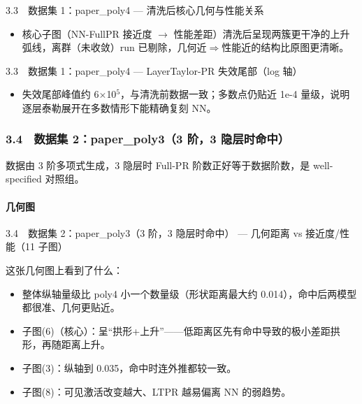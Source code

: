 \documentclass[UTF8,a4paper,11pt]{ctexart}
\begin{document}
3.3　数据集 1：paper\_poly4 --- 清洗后核心几何与性能关系

\begin{itemize}
\item 核心子图（NN-FullPR 接近度 $\to$ 性能差距）清洗后呈现两簇更干净的上升弧线，离群（未收敛）run 已剔除，几何近$\Rightarrow$性能近的结构比原图更清晰。
\end{itemize}

3.3　数据集 1：paper\_poly4 --- LayerTaylor-PR 失效尾部（log 轴）

\begin{itemize}
\item 失效尾部峰值约 6$\times$10$^5$，与清洗前数据一致；多数点仍贴近 1e-4 量级，说明逐层泰勒展开在多数情形下能精确复刻 NN。
\end{itemize}

\subsubsection{3.4　数据集 2：paper\_poly3（3 阶，3 隐层时命中）}

数据由 3 阶多项式生成，3 隐层时 Full-PR 阶数正好等于数据阶数，是 well-specified 对照组。

\paragraph{几何图}

3.4　数据集 2：paper\_poly3（3 阶，3 隐层时命中） --- 几何距离 vs 接近度/性能（11 子图）

这张几何图上看到了什么：

\begin{itemize}
\item 整体纵轴量级比 poly4 小一个数量级（形状距离最大约 0.014），命中后两模型都很准、几何更贴近。
\end{itemize}

\begin{itemize}
\item 子图(6)（核心）：呈“拱形+上升”------低距离区先有命中导致的极小差距拱形，再随距离上升。
\end{itemize}

\begin{itemize}
\item 子图(3)：纵轴到 0.035，命中时连外推都较一致。
\end{itemize}

\begin{itemize}
\item 子图(8)：可见激活改变越大、LTPR 越易偏离 NN 的弱趋势。
\end{itemize}
\end{document}
